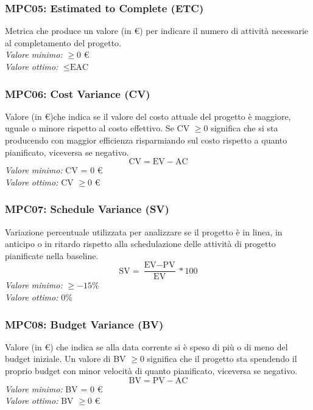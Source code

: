 \subsubsection{MPC05: Estimated to Complete (ETC)}
Metrica che produce un valore (in \euro) per indicare il numero di attività necessarie al completamento del progetto.\\
\textit{Valore minimo:} $\ge 0$ \euro\\
\textit{Valore ottimo:} $\le \text{EAC}$
\subsubsection{MPC06: Cost Variance (CV)}
Valore (in \euro)che indica se il valore del costo attuale del progetto è maggiore, uguale o minore rispetto al costo effettivo. Se CV $\ge 0$ significa che si sta producendo con maggior efficienza risparmiando sul costo rispetto a quanto pianificato, viceversa se negativo.
\begin{equation*}
\text{CV}=\text{EV}-\text{AC}
\end{equation*}
\textit{Valore minimo:} CV = 0 \euro\\
\textit{Valore ottimo:} CV $\ge 0$ \euro
\subsubsection{MPC07: Schedule Variance (SV)}
Variazione percentuale utilizzata per analizzare se il progetto è in linea, in anticipo o in ritardo rispetto alla schedulazione delle attività di progetto pianificate nella baseline.
\begin{equation*}
\text{SV}=\frac{\text{EV}-\text{PV}}{\text{EV}}*100
\end{equation*}
\textit{Valore minimo:} $\ge -15\%$\\
\textit{Valore ottimo:} 0\%
\subsubsection{MPC08: Budget Variance (BV)}
Valore (in \euro) che indica se alla data corrente si è speso di più o di meno del budget iniziale. Un valore di BV $\ge 0$ significa che il progetto sta spendendo il proprio budget con minor velocità di quanto pianificato, viceversa se negativo.
\begin{equation*}
\text{BV}=\text{PV}-\text{AC}
\end{equation*}
\textit{Valore minimo:} BV = 0 \euro\\
\textit{Valore ottimo:} BV $\ge 0 $ \euro

